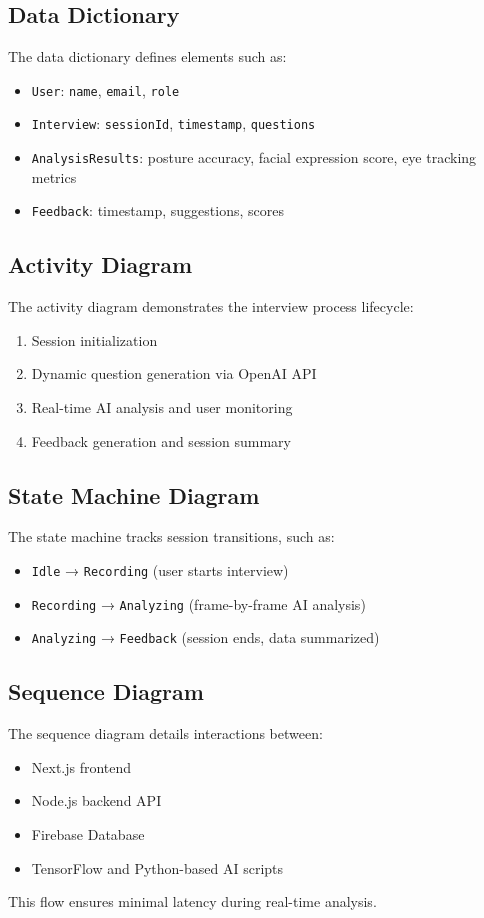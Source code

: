 \subsection{Data Dictionary}
The data dictionary defines elements such as:
\begin{itemize}
  \item \texttt{User}: \texttt{name}, \texttt{email}, \texttt{role}
  \item \texttt{Interview}: \texttt{sessionId}, \texttt{timestamp}, \texttt{questions}
  \item \texttt{AnalysisResults}: posture accuracy, facial expression score, eye tracking metrics
  \item \texttt{Feedback}: timestamp, suggestions, scores
\end{itemize}

\subsection{Activity Diagram}
The activity diagram demonstrates the interview process lifecycle:
\begin{enumerate}
  \item Session initialization
  \item Dynamic question generation via OpenAI API
  \item Real-time AI analysis and user monitoring
  \item Feedback generation and session summary
\end{enumerate}

\subsection{State Machine Diagram}
The state machine tracks session transitions, such as:
\begin{itemize}
  \item \texttt{Idle} → \texttt{Recording} (user starts interview)
  \item \texttt{Recording} → \texttt{Analyzing} (frame-by-frame AI analysis)
  \item \texttt{Analyzing} → \texttt{Feedback} (session ends, data summarized)
\end{itemize}

\subsection{Sequence Diagram}
The sequence diagram details interactions between:
\begin{itemize}
  \item Next.js frontend
  \item Node.js backend API
  \item Firebase Database
  \item TensorFlow and Python-based AI scripts
\end{itemize}
This flow ensures minimal latency during real-time analysis.

